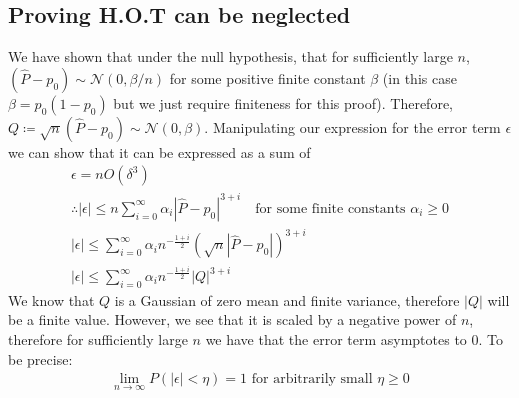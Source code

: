\documentclass[]{article}
\newcommand{\Gaussian}{\mathcal{N}}
\begin{document}
\subsection{Proving H.O.T can be neglected}
We have shown that under the null hypothesis, that for sufficiently large $n$, $(\hat{P}-p_0) \sim \Gaussian(0, \beta/n)$ for some positive finite constant $\beta$ (in this case $\beta = p_0(1-p_0)$ but we just require finiteness for this proof). Therefore, $Q \coloneqq \sqrt{n} (\hat{P} - p_0) \sim \Gaussian(0,\beta)$. Manipulating our expression for the error term $\epsilon$ we can show that it can be expressed as a sum of 
%
\begin{equation}
\begin{gathered}
\epsilon = n O(\delta^3) \\
\therefore |\epsilon| \leq n \sum_{i=0}^{\infty} \alpha_i|\hat{P} - p_0|^{3+i} 
\quad \text{for some finite constants } \alpha_i \geq 0 \\
|\epsilon| \leq \sum_{i=0}^{\infty} \alpha_i n^{-\frac{1+i}{2}}( \sqrt{n}|\hat{P} - p_0|)^{3+i} \\
|\epsilon| \leq \sum_{i=0}^{\infty} \alpha_i n^{-\frac{1+i}{2}}|Q|^{3+i}
\end{gathered}
\end{equation}
%
We know that $Q$ is a Gaussian of zero mean and finite variance, therefore $|Q|$ will be a finite value. However, we see that it is scaled by a negative power of $n$, therefore for sufficiently large $n$ we have that the error term asymptotes to 0. To be precise:
%
\begin{equation}
\begin{gathered}
\lim_{n \rightarrow \infty} P(|\epsilon| < \eta) = 1 \text{ for arbitrarily small } \eta \ge 0
\end{gathered}
\end{equation}
\end{document}
